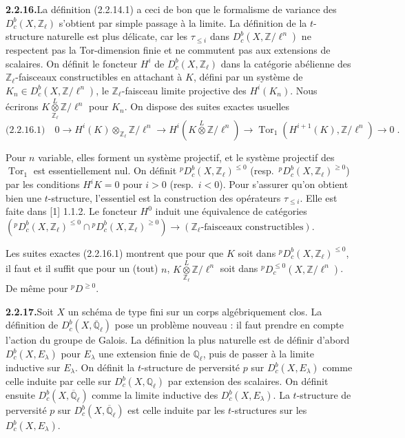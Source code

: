\documentclass[12pt,a4paper]{article}
\theoremstyle{plain}
\theoremstyle{definition}
\DeclareMathOperator{\Tor}{Tor}
\begin{document}
\smallskip
\noindent\textbf{2.2.16.}\quad La d\'efinition (2.2.14.1) a ceci de bon que le formalisme de variance des $D_c^b(X, \mathbb{Z}_\ell)$ s'obtient par simple passage \`a la limite. La d\'efinition de la $t$-structure naturelle est plus d\'elicate, car les $\tau_{\leqslant i}$ dans $D_c^b(X, \mathbb{Z}/\ell^n)$ ne respectent pas la Tor-dimension finie et ne commutent pas aux extensions de scalaires. On d\'efinit le foncteur $H^i$ de $D_c^b(X, \mathbb{Z}_\ell)$ dans la cat\'egorie ab\'elienne des $\mathbb{Z}_\ell$-faisceaux constructibles en attachant \`a $K$, d\'efini par un syst\`eme de $K_n \in D_c^b(X, \mathbb{Z}/\ell^n)$, le $\mathbb{Z}_\ell$-faisceau limite projective des $H^i(K_n)$. Nous \'ecrirons $K \overset{L}{\underset{\mathbb{Z}_\ell}{\otimes}} \mathbb{Z}/\ell^n$ pour $K_n$. On dispose des suites exactes usuelles
\[
\text{(2.2.16.1)}\quad 0 \to H^i(K) \otimes_{\mathbb{Z}_\ell} \mathbb{Z}/\ell^n \to H^i(K \overset{L}{\otimes} \mathbb{Z}/\ell^n) \to \Tor_1(H^{i+1}(K), \mathbb{Z}/\ell^n) \to 0\;.
\]

Pour $n$ variable, elles forment un syst\`eme projectif, et le syst\`eme projectif des $\Tor_1$ est essentiellement nul. On d\'efinit ${}^p D_c^b(X, \mathbb{Z}_\ell)^{\leqslant 0}$ (resp.\ ${}^p D_c^b(X, \mathbb{Z}_\ell)^{\geqslant 0}$) par les conditions $H^i K = 0$ pour $i > 0$ (resp.\ $i < 0$). Pour s'assurer qu'on obtient bien une $t$-structure, l'essentiel est la construction des op\'erateurs $\tau_{\leqslant i}$. Elle est faite dans [1] 1.1.2. Le foncteur $H^0$ induit une \'equivalence de cat\'egories $({}^p D_c^b(X, \mathbb{Z}_\ell)^{\leqslant 0} \cap {}^p D_c^b(X, \mathbb{Z}_\ell)^{\geqslant 0}) \to (\mathbb{Z}_\ell\text{-faisceaux constructibles})$.

Les suites exactes (2.2.16.1) montrent que pour que $K$ soit dans ${}^p D_c^b(X, \mathbb{Z}_\ell)^{\leqslant 0}$, il faut et il suffit que pour un (tout) $n$, $K \overset{L}{\underset{\mathbb{Z}_\ell}{\otimes}} \mathbb{Z}/\ell^n$ soit dans ${}^p D_c^{\leqslant 0}(X, \mathbb{Z}/\ell^n)$. De m\^eme pour ${}^p D^{\geqslant 0}$.

\smallskip
\noindent\textbf{2.2.17.}\quad Soit $X$ un sch\'ema de type fini sur un corps alg\'ebriquement clos. La d\'efinition de $D_c^b(X, \overline{\mathbb{Q}}_\ell)$ pose un probl\`eme nouveau : il faut prendre en compte l'action du groupe de Galois. La d\'efinition la plus naturelle est de d\'efinir d'abord $D_c^b(X, E_\lambda)$ pour $E_\lambda$ une extension finie de $\mathbb{Q}_\ell$, puis de passer \`a la limite inductive sur $E_\lambda$. On d\'efinit la $t$-structure de perversit\'e $p$ sur $D_c^b(X, E_\lambda)$ comme celle induite par celle sur $D_c^b(X, \mathbb{Q}_\ell)$ par extension des scalaires. On d\'efinit ensuite $D_c^b(X, \overline{\mathbb{Q}}_\ell)$ comme la limite inductive des $D_c^b(X, E_\lambda)$. La $t$-structure de perversit\'e $p$ sur $D_c^b(X, \overline{\mathbb{Q}}_\ell)$ est celle induite par les $t$-structures sur les $D_c^b(X, E_\lambda)$.
\end{document}
